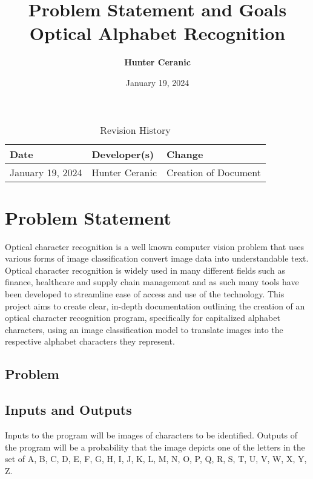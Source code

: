 \documentclass{article}
\title{Problem Statement and Goals\\Optical Alphabet Recognition}
\author{\textbf{Hunter Ceranic}}
\date{January 19, 2024}
\begin{document}
\maketitle

\begin{table}[hp]
\caption{Revision History} \label{TblRevisionHistory}
\begin{tabularx}{\textwidth}{llX}
\toprule
\textbf{Date} & \textbf{Developer(s)} & \textbf{Change}\\
\midrule
January 19, 2024 & Hunter Ceranic & Creation of Document\\
\bottomrule
\end{tabularx}
\end{table}

\section{Problem Statement}
Optical character recognition is a well known computer vision problem that uses various forms of image classification 
convert image data into understandable text. Optical character recognition is widely used in many different fields such as 
finance, healthcare and supply chain management and as such many tools have been developed to streamline ease of 
access and use of the technology. This project aims to create clear, in-depth documentation outlining
the creation of an optical character recognition program, specifically for capitalized alphabet characters, using 
an image classification model to translate images into the respective alphabet characters they represent.


\subsection{Problem}

\subsection{Inputs and Outputs}
Inputs to the program will be images of characters to be identified.
Outputs of the program will be a probability that the image depicts one of the letters in the 
set of {A, B, C, D, E, F, G, H, I, J, K, L, M, N, O, P, Q, R, S, T, U, V, W, X, Y, Z}.
\end{document}
